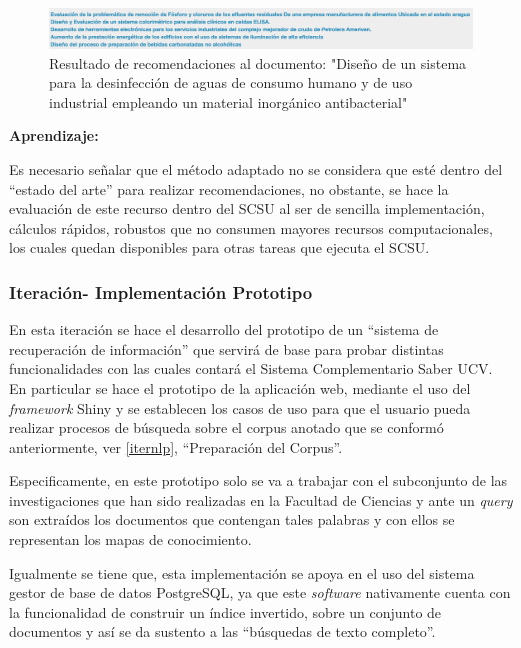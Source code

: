 \documentclass[
  12pt,
  openany]{book}
\begin{document}
\begin{figure}

{\centering \includegraphics[width=0.9\linewidth]{images/05-desarrollo/2_ciclo/similitud_reco2} 

}

\caption{Resultado de recomendaciones al documento: "Diseño de un sistema para la desinfección de aguas de consumo humano y de uso industrial empleando un material inorgánico antibacterial"}\label{fig:similitudreco}
\end{figure}

\textbf{Aprendizaje:}

Es necesario señalar que el método adaptado no se considera que esté dentro del ``estado del arte'' para realizar recomendaciones, no obstante, se hace la evaluación de este recurso dentro del SCSU al ser de sencilla implementación, cálculos rápidos, robustos que no consumen mayores recursos computacionales, los cuales quedan disponibles para otras tareas que ejecuta el SCSU.

\hypertarget{iterbol}{%
\subsubsection{Iteración- Implementación Prototipo}\label{iterbol}}

En esta iteración se hace el desarrollo del prototipo de un ``sistema de recuperación de información'' que servirá de base para probar distintas funcionalidades con las cuales contará el Sistema Complementario Saber UCV. En particular se hace el prototipo de la aplicación web, mediante el uso del \emph{framework} Shiny y se establecen los casos de uso para que el usuario pueda realizar procesos de búsqueda sobre el corpus anotado que se conformó anteriormente, ver \ref{iternlp}, ``Preparación del Corpus''.

Especificamente, en este prototipo solo se va a trabajar con el subconjunto de las investigaciones que han sido realizadas en la Facultad de Ciencias y ante un \emph{query} son extraídos los documentos que contengan tales palabras y con ellos se representan los mapas de conocimiento.

Igualmente se tiene que, esta implementación se apoya en el uso del sistema gestor de base de datos PostgreSQL, ya que este \emph{software} nativamente cuenta con la funcionalidad de construir un índice invertido, sobre un conjunto de documentos y así se da sustento a las ``búsquedas de texto completo''.
\end{document}
